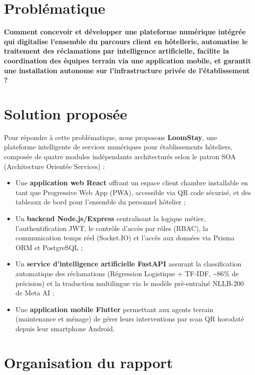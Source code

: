 \section*{Problématique}

\textbf{Comment concevoir et développer une plateforme numérique intégrée qui digitalise l'ensemble du parcours client en hôtellerie, automatise le traitement des réclamations par intelligence artificielle, facilite la coordination des équipes terrain via une application mobile, et garantit une installation autonome sur l'infrastructure privée de l'établissement ?}

\section*{Solution proposée}

Pour répondre à cette problématique, nous proposons \textbf{LoomStay}, une plateforme intelligente de services numériques pour établissements hôteliers, composée de quatre modules indépendants architecturés selon le patron SOA (Architecture Orientée Services) :

\begin{itemize}
  \item Une \textbf{application web React} offrant un espace client chambre installable en tant que Progressive Web App (PWA), accessible via QR code sécurisé, et des tableaux de bord pour l'ensemble du personnel hôtelier ;
  \item Un \textbf{backend Node.js/Express} centralisant la logique métier, l'authentification JWT, le contrôle d'accès par rôles (RBAC), la communication temps réel (Socket.IO) et l'accès aux données via Prisma ORM et PostgreSQL ;
  \item Un \textbf{service d'intelligence artificielle FastAPI} assurant la classification automatique des réclamations (Régression Logistique + TF-IDF, \textasciitilde{}86\% de précision) et la traduction multilingue via le modèle pré-entraîné NLLB-200 de Meta AI ;
  \item Une \textbf{application mobile Flutter} permettant aux agents terrain (maintenance et ménage) de gérer leurs interventions par scan QR horodaté depuis leur smartphone Android.
\end{itemize}

\section*{Organisation du rapport}

